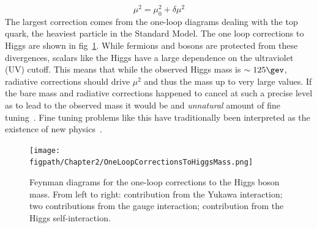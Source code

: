 \begin{itemize}
		\begin{equation}
			\mu^{2}=\mu_{0}^{2}+\delta\mu^{2}
		\end{equation}
	The largest correction comes from the one-loop diagrams dealing with the top quark, the heaviest particle in the Standard Model. The one loop corrections to Higgs are shown in fig~\ref{fig:one_loop_corrections_to_higgs_mass}. While fermions and bosons are protected from these divergences, scalars like the Higgs have a large dependence on the ultraviolet (UV) cutoff. This means that while the observed Higgs mass is $\sim\textrm{125}\gev$, radiative corrections should drive $\mu^{2}$ and thus the mass up to very large values. If the bare mass and radiative corrections happened to cancel at such a precise level as to lead to the observed mass it would be and \textit{unnatural} amount of fine tuning~\cite{SUSSKIND1984181}. Fine tuning problems like this have traditionally been interpreted as the existence of new physics~\cite{Morrissey20121}.
\end{itemize}
\begin{figure}[hbt]
    \centering
    \texttt{[image: \\figpath/Chapter2/OneLoopCorrectionsToHiggsMass.png]}
    \caption{Feynman diagrams for the one-loop corrections to the Higgs boson mass. From left to right: contribution from the Yukawa interaction; two contributions from the gauge interaction; contribution from the Higgs self-interaction.}
    \label{fig:one_loop_corrections_to_higgs_mass}
\end{figure}

